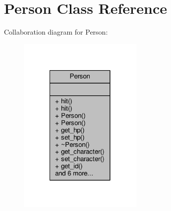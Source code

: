 \hypertarget{class_person}{\section{Person Class Reference}
\label{class_person}
}


Collaboration diagram for Person\-:
\nopagebreak
\begin{figure}[H]
\begin{center}
\leavevmode
\includegraphics[width=170pt]{class_person__coll__graph}
\end{center}
\end{figure}
